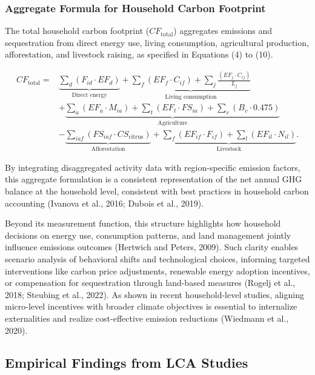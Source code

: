 \documentclass[12pt,a4paper]{article}%
\begin{document}
\subsubsection{Aggregate Formula for Household Carbon Footprint}

The total household carbon footprint ($CF_{\text{total}}$) aggregates emissions and sequestration from direct energy use, living consumption, agricultural production, afforestation, and livestock raising, as specified in Equations (4) to (10).

\begin{align}
CF_{\text{total}} = & \underbrace{\sum_d \left(F_{id} \cdot EF_d\right)}_{\text{Direct energy}} + 
\underbrace{\sum_f \left(EF_f \cdot C_{if}\right) + \sum_j \frac{\left(EF_j \cdot C_{ij}\right)}{L_j}}_{\text{Living consumption}} \nonumber \\
& + \underbrace{\sum_a \left(EF_a \cdot M_{ia}\right) + \sum_t \left(EF_t \cdot FS_{ia}\right) + \sum_v \left(B_v \cdot 0.475\right)}_{\text{Agriculture}} \nonumber \\
& - \underbrace{\sum_{iaf} \left(FS_{iaf} \cdot CS_{\text{citrus}}\right)}_{\text{Afforestation}} +
\underbrace{\sum_f \left(EF_{if} \cdot F_{if}\right) + \sum_l \left(EF_{il} \cdot N_{il}\right)}_{\text{Livestock}}.
\label{eq:aggregate}
\end{align}

By integrating disaggregated activity data with region-specific emission factors, this aggregate formulation is a consistent representation of the net annual GHG balance at the household level, consistent with best practices in household carbon accounting (Ivanova et al., 2016; Dubois et al., 2019). 

Beyond its measurement function, this structure highlights how household decisions on energy use, consumption patterns, and land management jointly influence emissions outcomes (Hertwich and Peters, 2009). Such clarity enables scenario analysis of behavioral shifts and technological choices, informing targeted interventions like carbon price adjustments, renewable energy adoption incentives, or compensation for sequestration through land-based measures (Rogelj et al., 2018; Steubing et al., 2022). As shown in recent household-level studies, aligning micro-level incentives with broader climate objectives is essential to internalize externalities and realize cost-effective emission reductions (Wiedmann et al., 2020).

\subsection{Empirical Findings from LCA Studies}
\end{document}
